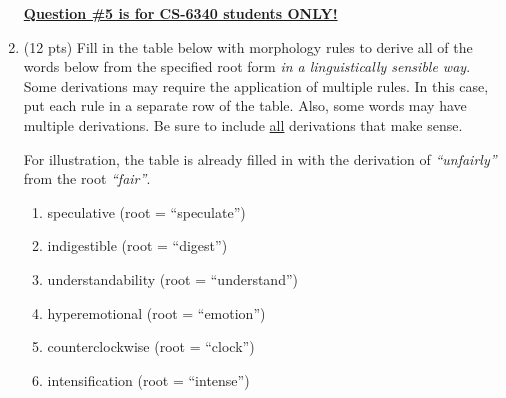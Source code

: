 \documentclass[11pt]{article}
\begin{document}
\begin{enumerate}
\newpage
\underline{\textbf{Question \#5 is for CS-6340 students ONLY!}}  \\

\item (12 pts) Fill in the table below with morphology rules to derive all
  of the words below from the specified root form {\it in a
    linguistically sensible way}. Some derivations may require the
  application of multiple rules. In this case, put each 
  rule in a separate row of the table. Also, some words may have
  multiple derivations. Be sure to include \underline{all} derivations that make
  sense.

  For illustration, the table is already filled in with the derivation
  of {\it ``unfairly''} from the root {\it ``fair''}. 

\begin{enumerate}

\item speculative (root = ``speculate'')

\item indigestible (root = ``digest'')

\item understandability (root = ``understand'')

\item hyperemotional (root = ``emotion'')

\item counterclockwise (root = ``clock'')

\item intensification (root = ``intense'')

\end{enumerate}



\end{enumerate}
\end{document}

